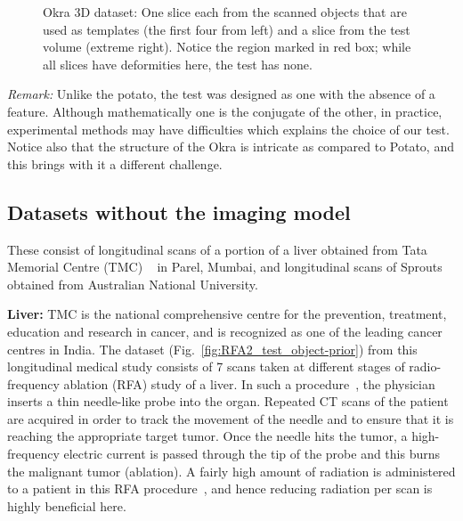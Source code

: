 \documentclass[journal]{IEEEtran}
\begin{document}
\begin{figure}[!h]
\begin{subfigure}[b]{0.148\linewidth}
\captionsetup{labelformat=empty}
        \caption{}
    \end{subfigure}
     \caption{Okra 3D dataset: One slice each from the scanned objects
       that are used as templates (the first four from left) and a
       slice from the test volume (extreme right). Notice the region
       marked in red box; while all slices have deformities here, the
       test has none.}
\label{fig:object-prior_test_okra}
\end{figure}

\textit{Remark:} Unlike the potato, the test was designed as one with
the absence of a feature.  Although mathematically one is the
conjugate of the other, in practice, experimental methods may have
difficulties which explains the choice of our test. Notice also that
the structure of the Okra is intricate as compared to Potato, and this
brings with it a different challenge.



\subsection{Datasets without the imaging model}
These consist of longitudinal scans of a portion of a liver obtained
from Tata Memorial Centre (TMC) ~\cite{tmh} in Parel, Mumbai, and
longitudinal scans of Sprouts obtained from Australian National
University.

 \textbf{Liver:} %
TMC is the national comprehensive centre for the prevention,
treatment, education and research in cancer, and is recognized as one
of the leading cancer centres in India. The dataset
(Fig.~\ref{fig:RFA2_test_object-prior}) from this longitudinal medical
study consists of 7 scans taken at different stages of radio-frequency
ablation (RFA) study of a liver. In such a procedure~\cite{Dong2015}, the
physician inserts a thin needle-like probe into the organ. Repeated CT
scans of the patient are acquired in order to track the movement of
the needle and to ensure that it is reaching the appropriate target
tumor. Once the needle hits the tumor, a high-frequency electric
current is passed through the tip of the probe and this burns the
malignant tumor (ablation).  A fairly high amount of radiation is administered to a patient in this RFA procedure~\cite{radiation_dose_RFA}, and hence reducing radiation per scan is highly beneficial here.
\end{document}
